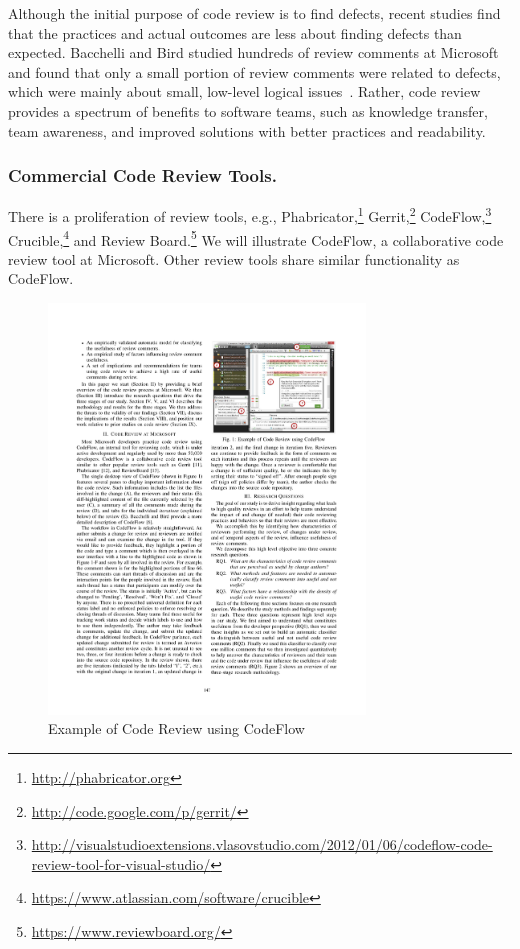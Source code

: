 \documentclass[runningheads,a4paper]{llncs}
\begin{document}
Although the initial purpose of code review is to find defects, recent studies find that the practices and actual outcomes are less about finding defects than expected. Bacchelli and Bird studied hundreds of review comments at Microsoft and found that only a small portion of review comments were related to defects, which were mainly about small, low-level logical issues~\cite{bacchelli2013expectations}. Rather, code review provides a spectrum of benefits to software teams, such as knowledge transfer, team awareness, and improved solutions with better practices and readability. 

\subsubsection{Commercial Code Review Tools.} 

There is a proliferation of review tools, e.g., Phabricator,\footnote{\url{http://phabricator.org}} Gerrit,\footnote{\url{http://code.google.com/p/gerrit/}} CodeFlow,\footnote{\url{http://visualstudioextensions.vlasovstudio.com/2012/01/06/codeflow-code-review-tool-for-visual-studio/}} Crucible,\footnote{\url{https://www.atlassian.com/software/crucible}} and Review Board.\footnote{\url{https://www.reviewboard.org/}} We will illustrate CodeFlow, a collaborative code review tool at Microsoft. Other review tools share similar functionality as CodeFlow.

\begin{figure}[ht]
 \centering
 \includegraphics[width=0.75\textwidth]{images/codeflow.pdf}
 \caption{Example of Code Review using CodeFlow~\cite{bosu2015characteristics}}
 \label{fig:codeflow}
\end{figure}
\end{document}
